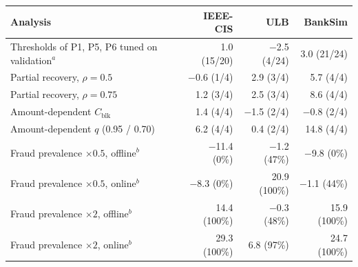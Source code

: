 \begin{tabular}{lrrr}
\toprule
Analysis & IEEE-CIS & ULB & BankSim \\
\midrule
Thresholds of P1, P5, P6 tuned on validation$^{a}$ & 1.0 (15/20) & $-$2.5 (4/24) & 3.0 (21/24) \\
Partial recovery, $\rho=0.5$ & $-$0.6 (1/4) & 2.9 (3/4) & 5.7 (4/4) \\
Partial recovery, $\rho=0.75$ & 1.2 (3/4) & 2.5 (3/4) & 8.6 (4/4) \\
Amount-dependent $C_{\mathrm{blk}}$ & 1.4 (4/4) & $-$1.5 (2/4) & $-$0.8 (2/4) \\
Amount-dependent $q$ (0.95 / 0.70) & 6.2 (4/4) & 0.4 (2/4) & 14.8 (4/4) \\
Fraud prevalence $\times0.5$, offline$^{b}$ & $-$11.4 (0\%) & $-$1.2 (47\%) & $-$9.8 (0\%) \\
Fraud prevalence $\times0.5$, online$^{b}$ & $-$8.3 (0\%) & 20.9 (100\%) & $-$1.1 (44\%) \\
Fraud prevalence $\times2$, offline$^{b}$ & 14.4 (100\%) & $-$0.3 (48\%) & 15.9 (100\%) \\
Fraud prevalence $\times2$, online$^{b}$ & 29.3 (100\%) & 6.8 (97\%) & 24.7 (100\%) \\
\bottomrule
\end{tabular}
